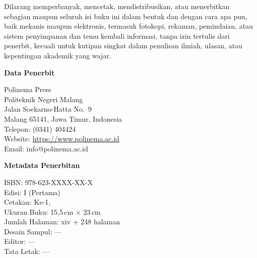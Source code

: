 \begin{titlepage}
\begin{tcolorbox}[
    enhanced,
    colback=white,
    colframe=black!45,
    boxrule=0.5pt,
    arc=1.5pt,
    left=8pt,
    right=8pt,
    top=8pt,
    bottom=8pt
]
\vspace{0.35cm}

Dilarang memperbanyak, mencetak, mendistribusikan, atau menerbitkan sebagian maupun seluruh isi buku ini dalam bentuk dan dengan cara apa pun, baik mekanis maupun elektronis, termasuk fotokopi, rekaman, pemindaian, atau sistem penyimpanan dan temu kembali informasi, tanpa izin tertulis dari penerbit, kecuali untuk kutipan singkat dalam penulisan ilmiah, ulasan, atau kepentingan akademik yang wajar.
\end{tcolorbox}

\vspace{0.45cm}

\begin{minipage}[t]{0.48\textwidth}
\begin{tcolorbox}[
    enhanced,
    colback=black!2,
    colframe=black!45,
    boxrule=0.5pt,
    arc=1.5pt,
    left=8pt,
    right=8pt,
    top=8pt,
    bottom=8pt,
    height=6.25cm
]
{\bfseries\sffamily Data Penerbit}\par
\vspace{0.25cm}
Polinema Press\\
Politeknik Negeri Malang\\
Jalan Soekarno-Hatta No.~9\\
Malang 65141, Jawa Timur, Indonesia\\[0.2cm]
Telepon: (0341) 404424\\
Website: \url{https://www.polinema.ac.id}\\
Email: info@polinema.ac.id
\end{tcolorbox}
\end{minipage}
\hfill
\begin{minipage}[t]{0.48\textwidth}
\begin{tcolorbox}[
    enhanced,
    colback=black!2,
    colframe=black!45,
    boxrule=0.5pt,
    arc=1.5pt,
    left=8pt,
    right=8pt,
    top=8pt,
    bottom=8pt,
    height=6.25cm
]
{\bfseries\sffamily Metadata Penerbitan}\par
\vspace{0.25cm}
ISBN: 978-623-XXXX-XX-X\\
Edisi: I (Pertama)\\
Cetakan: Ke-1, \the\year\\
Ukuran Buku: 15{,}5\,cm $\times$ 23\,cm\\
Jumlah Halaman: xiv + 248 halaman\\
Desain Sampul: ---\\
Editor: ---\\
Tata Letak: ---
\end{tcolorbox}
\end{minipage}


\end{titlepage}
